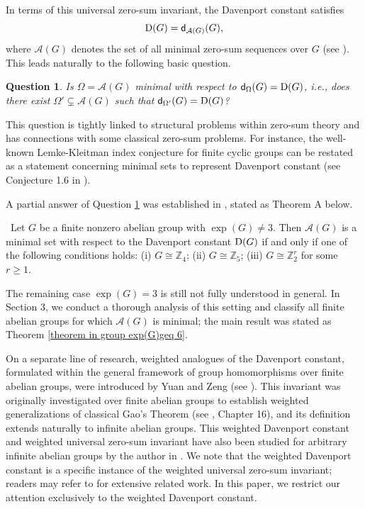 \documentclass[a4paper, 12pt]{article}
\newtheorem{question}[theorem]{Question}
\begin{document}
In terms of this universal zero-sum invariant, the Davenport constant satisfies
$${\rm D}(G)={\mathsf d}_{\mathcal A(G)}(G),$$
where $\mathcal A(G)$ denotes the set of all minimal zero-sum sequences over $G$ (see \cite{GH}). This leads naturally to the following basic question.


\begin{question}\label{question} \cite{WangcommInAlgebra}
Is $\Omega=\mathcal A (G)$ minimal with respect to ${\mathsf d}_{\Omega}(G)={\rm D}(G)$, i.e., does there exist $\Omega'\subsetneq\mathcal A (G)$ such that ${\mathsf d}_{\Omega'}(G)={\rm D}(G)$?
\end{question}

This question is tightly linked to structural problems within zero-sum theory and has connections with some classical zero-sum problems. For instance, the well-known Lemke-Kleitman index conjecture \cite{LemkeKleitman} for finite cyclic groups can be restated as a statement concerning minimal sets to represent Davenport constant (see Conjecture 1.6 in \cite{WangcommInAlgebra}).

A partial answer of Question \ref{question} was established in \cite{WangcommInAlgebra}, stated as
Theorem A below.

 \ {Let $G$ be a finite nonzero abelian group with $\exp(G)\neq 3$. Then $\mathcal A (G)$ is a minimal set with respect to the Davenport constant ${\rm D}(G)$ if and only if one of the following conditions holds: (i)  $G\cong \mathbb{Z}_4$; (ii) $G\cong \mathbb{Z}_5$; (iii) $G\cong \mathbb{Z}_2^r$ for some $r\geq 1$.}

The remaining case $\exp(G)=3$ is still not fully understood in general. In Section 3, we conduct a thorough analysis of this setting and classify all finite abelian groups for which $\mathcal A(G)$ is minimal; the main result was stated as Theorem \ref{theorem in group exp(G)geq 6}.




On a separate line of research, weighted analogues of the Davenport constant, formulated within the general framework of group homomorphisms over finite abelian groups, were introduced by Yuan and Zeng (see \cite{ZengYuanDiscrete}). This invariant was originally investigated over finite abelian groups to establish weighted generalizations of classical Gao's Theorem (see \cite{Grynkiewiczmono}, Chapter 16), and its definition extends naturally to infinite abelian groups. This weighted Davenport constant and weighted universal zero-sum invariant have also been studied for arbitrary infinite abelian groups by the author in \cite{WangcommInAlgebra}. We note that the weighted Davenport constant is a specific instance of the weighted universal zero-sum invariant; readers may refer to \cite{WangcommInAlgebra} for extensive related work. In this paper, we restrict our attention exclusively to the weighted Davenport constant.
\end{document}
